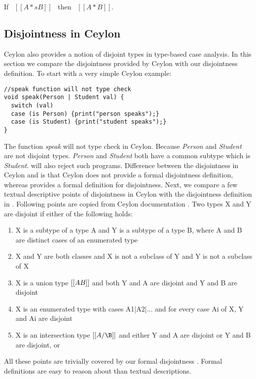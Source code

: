 \begin{lemma}
  If \ $[[A *s B]]$ \ then \ $[[A * B]]$.
\label{lemma:inter:disj-complete}
\end{lemma}


\subsection{Disjointness in Ceylon}
\label{sec:inter:ceylon}
Ceylon also provides a notion of disjoint types in type-based case analysis. In this section
we compare the disjointness provided by Ceylon with our disjointness definition.
To start with a very simple Ceylon example:

\begin{lstlisting}[xleftmargin=.2\textwidth, xrightmargin=.2\textwidth,caption=Ceylon disjointness code example]
//speak function will not type check
void speak(Person | Student val) {
  switch (val)
  case (is Person) {print("person speaks");}
  case (is Student) {print("student speaks");} 
}
\end{lstlisting}

\noindent The function \emph{speak} will not type check in Ceylon. Because \emph{Person} and
\emph{Student} are not disjoint types. \emph{Person} and \emph{Student} both have a common
subtype which is \emph{Student}. \cal will also reject such programs.
Difference between the disjointness in Ceylon and \cal is that
Ceylon does not provide
a formal disjointness definition, whereas \cal provides a formal definition for
disjointness. Next, we compare a few textual descriptive points of disjointness in Ceylon with
the disjointness definition in \cal. Following points are copied from Ceylon
documentation \cite{}. Two types X and Y are disjoint if either of the following holds:

\begin{enumerate}
  \item{X is a subtype of a type A and Y is a subtype of a type B, where A and B are distinct cases of an enumerated type}
  \item{X and Y are both classes and X is not a subclass of Y and Y is not a subclass of X}
  \item{X is a union type $[[A \/ B]]$ and both Y and A are disjoint and Y and B are disjoint}
  \item{X is an enumerated type with cases A1|A2|... and for every case Ai of X, Y and Ai are disjoint}
  \item{X is an intersection type $[[A/\B]]$ and either Y and A are disjoint or Y and B are disjoint, or}
\end{enumerate}

\noindent All these points are trivially covered by our formal disjointness .
Formal definitions are easy to reason about than textual descriptions.
